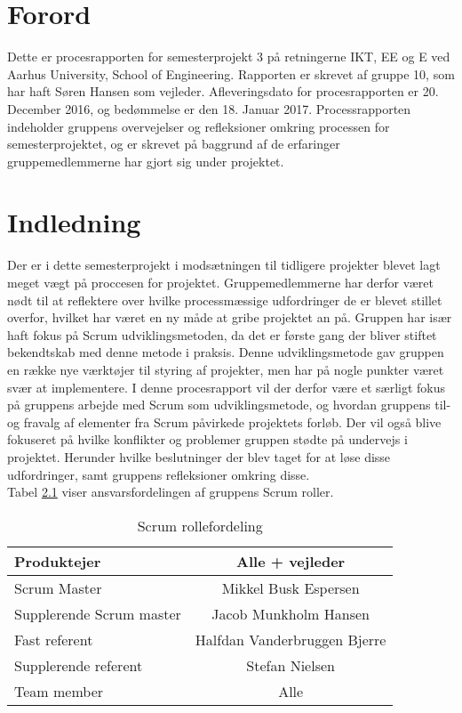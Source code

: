 \chapter{Forord}
Dette er procesrapporten for semesterprojekt 3 på retningerne IKT, EE og E ved Aarhus University, School of Engineering. Rapporten er skrevet af gruppe 10, som har haft Søren Hansen som vejleder. Afleveringsdato for procesrapporten er 20. December 2016, og bedømmelse er den 18. Januar 2017. Processrapporten indeholder gruppens overvejelser og refleksioner omkring processen for semesterprojektet, og er skrevet på baggrund af de erfaringer gruppemedlemmerne har gjort sig under projektet.    

\chapter{Indledning}
Der er i dette semesterprojekt i modsætningen til tidligere projekter blevet lagt meget vægt på proccesen for projektet. Gruppemedlemmerne har derfor været nødt til at reflektere over hvilke processmæssige udfordringer de er blevet stillet overfor, hvilket har været en ny måde at gribe projektet an på. Gruppen har især haft fokus på Scrum udviklingsmetoden, da det er første gang der bliver stiftet bekendtskab med denne metode i praksis. Denne udviklingsmetode gav gruppen en række nye værktøjer til styring af projekter, men har på nogle punkter været svær at implementere. I denne procesrapport vil der derfor være et særligt fokus på gruppens arbejde med Scrum som udviklingsmetode, og hvordan gruppens til- og fravalg af elementer fra Scrum påvirkede projektets forløb. Der vil også blive fokuseret på hvilke konflikter og problemer gruppen stødte på undervejs i projektet. Herunder hvilke beslutninger der blev taget for at løse disse udfordringer, samt gruppens refleksioner omkring disse.
\\
Tabel \ref{roller} viser ansvarsfordelingen af gruppens Scrum roller. \\

\begin{table}
	\centering
	\begin{tabular}{| l | c |}
		\hline
		Produktejer & Alle + vejleder\\
		\hline
		Scrum Master & Mikkel Busk Espersen\\
		\hline
		Supplerende Scrum master & Jacob Munkholm Hansen\\
		\hline
		Fast referent & Halfdan Vanderbruggen Bjerre\\
		\hline
		Supplerende referent & Stefan Nielsen\\
		\hline
		Team member & Alle\\
		\hline
	\end{tabular}
	\caption{Scrum rollefordeling}
	\label{roller}
\end{table}

